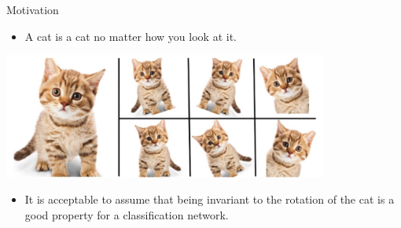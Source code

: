 \documentclass{beamer}
\begin{document}
\begin{frame}{Motivation}
    \begin{itemize}
        \setlength{\itemsep}{\fill}
        \item A cat is a cat no matter how you look at it.
    \end{itemize}

    \begin{center}
        \includegraphics[width=0.8\textwidth]{../figures/cat.png}
    \end{center}

    \begin{itemize}
        \setlength{\itemsep}{\fill}
        \item It is acceptable to assume that being invariant to the rotation of the cat is a good property for a classification network.
    \end{itemize}
\end{frame}
\end{document}
